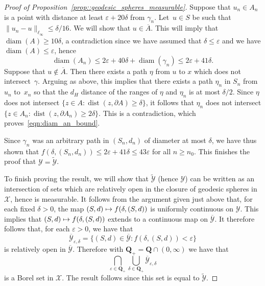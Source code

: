 \documentclass[10pt]{amsart}
\let\mathcal\mathscr
\newcommand\mto{\mathchoice{\longmapsto}{\mapsto}{\mapsto}{\mapsto}}
\let\epsilon\varepsilon
\theoremstyle{plain}
\numberwithin{theorem}{section}
\theoremstyle{definition}
\newcommand{\Q}{{\mathbf Q}}
\DeclareMathOperator{\dist}{dist}
\DeclareMathOperator{\diam}{diam}
\newcommand{\gh}{{\mathcal X}}
\newcommand{\spheresgeo}{{\mathcal Y}}
\newcommand{\spheresgeoclose}{\ol{\spheresgeo}}
\let\ol\overline
\let\wt\widetilde
\begin{document}
\begin{proof}[Proof of Proposition~\ref{prop::geodesic_spheres_measurable}]
Suppose that $u_n \in A_n$ is a point with distance at least $\epsilon+20\delta$ from $\gamma_n$. Let~\hbox{$u \in S$} be such that $\|u_n - u\|_{\ell_\infty} \leq \delta/16$. We will show that $u \in \ol{A}$. This will imply that $\diam(A) \geq 10\delta$, a contradiction since we have assumed that $\delta \leq \epsilon$ and we have $\diam(A) \leq \epsilon$, hence
\begin{equation}
\label{eqn:diam_an_bound}
\diam(A_n) \leq 2\epsilon + 40\delta + \diam(\gamma_n) \leq 2\epsilon + 41\delta.	
\end{equation}
Suppose that $u \notin \ol{A}$. Then there exists a path $\eta$ from $u$ to $x$ which does not intersect~$\gamma$. Arguing as above, this implies that there exists a path $\eta_n$ in $S_n$ from~$u_n$ to~$x_n$ so that the $d_H$ distance of the ranges of $\eta$ and $\eta_n$ is at most $\delta/2$. Since $\eta$ does not intersect \hbox{$\{z \in A : \dist(z,\partial A) \geq \delta\}$}, it follows that $\eta_n$ does not intersect \hbox{$\{z \in A_n : \dist(z,\partial A_n) \geq 2\delta\}$}. This is a contradiction, which proves~\eqref{eqn:diam_an_bound}.

Since $\gamma_n$ was an arbitrary path in $(S_n,d_n)$ of diameter at most $\delta$, we have thus shown that $f(\delta,(S_n,d_n)) \leq 2\epsilon+41\delta \leq 43\epsilon$ for all $n \geq n_0$. This finishes the proof that $\spheresgeo = \wt{\spheresgeo}$.

To finish proving the result, we will show that $\wt{\spheresgeo}$ (hence $\spheresgeo$) can be written as an intersection of sets which are relatively open in the closure of geodesic spheres in $\gh$, hence is measurable. It follows from the argument given just above that, for each fixed $\delta > 0$, the map $(S,d) \mto f(\delta, (S,d))$ is uniformly continuous on $\spheresgeo$. This implies that $(S,d) \mto f(\delta, (S,d))$ extends to a continuous map on $\spheresgeoclose$. It therefore follows that, for each $\epsilon > 0$, we have that
\[
\ol{\spheresgeo}_{\epsilon,\delta} = \{ (S,d) \in \spheresgeoclose : f(\delta, (S,d)) < \epsilon\}
\]
is relatively open in $\spheresgeoclose$. Therefore with $\Q_+ = \Q \cap (0,\infty)$ we have that
\[
\bigcap_{\epsilon \in \Q_+} \bigcup_{\delta \in \Q_+} \ol{\spheresgeo}_{\epsilon,\delta}
\]
is a Borel set in $\gh$. The result follows since this set is equal to $\wt{\spheresgeo}$.
\end{proof}
\end{document}
